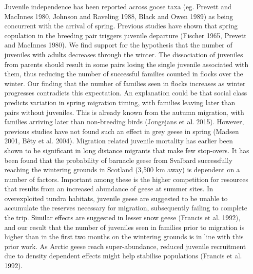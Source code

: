 \documentclass[10pt,twocolumn]{paper}
\begin{document}
Juvenile independence has been reported across goose taxa (eg. Prevett
and MacInnes 1980, Johnson and Raveling 1988, Black and Owen 1989) as
being concurrent with the arrival of spring. Previous studies have shown
that spring copulation in the breeding pair triggers juvenile departure
(Fischer 1965, Prevett and MacInnes 1980). We find support for the
hypothesis that the number of juveniles with adults decreases through
the winter. The dissociation of juveniles from parents should result in
some pairs losing the single juvenile associated with them, thus
reducing the number of successful families counted in flocks over the
winter. Our finding that the number of families seen in flocks increases
as winter progresses contradicts this expectation. An explanation could
be that social class predicts variation in spring migration timing, with
families leaving later than pairs without juveniles. This is already
known from the autumn migration, with families arriving later than
non-breeding birds (Jongejans et al. 2015). However, previous studies
have not found such an effect in grey geese in spring (Madsen 2001, Bêty
et al. 2004). Migration related juvenile mortality has earlier been
shown to be significant in long distance migrants that make few
stop-overs. It has been found that the probability of barnacle geese
from Svalbard successfully reaching the wintering grounds in Scotland
(3,500 km away) is dependent on a number of factors. Important among
these is the higher competition for resources that results from an
increased abundance of geese at summer sites. In overexploited tundra
habitats, juvenile geese are suggested to be unable to accumulate the
reserves necessary for migration, subsequently failing to complete the
trip. Similar effects are suggested in lesser snow geese (Francis et al.
1992), and our result that the number of juveniles seen in families
prior to migration is higher than in the first two months on the
wintering grounds is in line with this prior work. As Arctic geese reach
super-abundance, reduced juvenile recruitment due to density dependent
effects might help stabilise populations (Francis et al. 1992).
\end{document}
